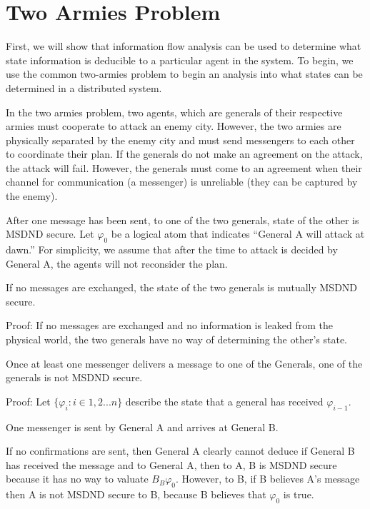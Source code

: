 \section{Two Armies Problem}

First, we will show that information flow analysis can be used to determine what state information is deducible to a particular agent in the system. To begin, we use the common two-armies problem to begin an analysis into what states can be determined in a distributed system.

In the two armies problem, two agents, which are generals of their respective armies must cooperate to attack an enemy city. However, the two armies are physically separated by the enemy city and must send messengers to each other to coordinate their plan. If the generals do not make an agreement on the attack, the attack will fail. However, the generals must come to an agreement when their channel for communication (a messenger) is unreliable (they can be captured by the enemy).

After one message has been sent, to one of the two generals, state of the other is MSDND secure. Let $\varphi_0$ be a logical atom that indicates ``General A will attack at dawn.'' For simplicity, we assume that after the time to attack is decided by General A, the agents will not reconsider the plan.

\begin{thm}
If no messages are exchanged, the state of the two generals is mutually MSDND secure. \label{thm:nomsg}
\end{thm}

Proof: If no messages are exchanged and no information is leaked from the physical world, the two generals have no way of determining the other's state.

\begin{thm}
Once at least one messenger delivers a message to one of the Generals, one of the generals is not MSDND secure.
\end{thm}

Proof:
Let $\{ \varphi_i : i \in 1,2 ... n \}$ describe the state that a general has received $\varphi_{i-1}$.

\begin{case}
One messenger is sent by General A and arrives at General B.
\label{case:generalsn0}
\end{case}

If no confirmations are sent, then General A clearly cannot deduce if General B has received the message and to General A, then to A, B is MSDND secure because it has no way to valuate $B_B \varphi_0$. However, to B, if B believes A's message then A is not MSDND secure to B, because B believes that $\varphi_0$ is true.

